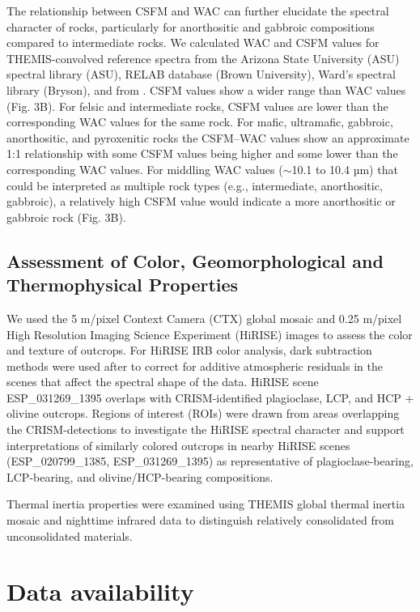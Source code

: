 \documentclass[11pt]{article}
\begin{document}
The relationship between CSFM and WAC can further elucidate the spectral character of rocks, particularly for anorthositic and gabbroic compositions compared to intermediate rocks. We calculated WAC and CSFM values for THEMIS-convolved reference spectra from the Arizona State University (ASU) spectral library (ASU), RELAB database (Brown University), Ward's spectral library (Bryson), and from \citet{Dunn2021}. CSFM values show a wider range than WAC values (Fig. 3B). For felsic and intermediate rocks, CSFM values are lower than the corresponding WAC values for the same rock. For mafic, ultramafic, gabbroic, anorthositic, and pyroxenitic rocks the CSFM--WAC values show an approximate 1:1 relationship with some CSFM values being higher and some lower than the corresponding WAC values. For middling WAC values ($\sim$10.1 to 10.4 µm) that could be interpreted as multiple rock types (e.g., intermediate, anorthositic, gabbroic), a relatively high CSFM value would indicate a more anorthositic or gabbroic rock (Fig. 3B).

\subsection*{Assessment of Color, Geomorphological and Thermophysical Properties}

We used the 5 m/pixel Context Camera (CTX) global mosaic \citep{Malin2007, Dickson2018} and 0.25 m/pixel High Resolution Imaging Science Experiment (HiRISE) images \citep{McEwen2010} to assess the color and texture of outcrops. For HiRISE IRB color analysis, dark subtraction methods were used after \citet{Tornabene2018} to correct for additive atmospheric residuals in the scenes that affect the spectral shape of the data. HiRISE scene ESP\_031269\_1395 overlaps with CRISM-identified plagioclase, LCP, and HCP + olivine outcrops. Regions of interest (ROIs) were drawn from areas overlapping the CRISM-detections to investigate the HiRISE spectral character and support interpretations of similarly colored outcrops in nearby HiRISE scenes (ESP\_020799\_1385, ESP\_031269\_1395) as representative of plagioclase-bearing, LCP-bearing, and olivine/HCP-bearing compositions.

Thermal inertia properties were examined using THEMIS global thermal inertia mosaic \citep{Fergason2006, Edwards2009} and nighttime infrared data \citep{Edwards2011} to distinguish relatively consolidated from unconsolidated materials.

\section*{Data availability}
\end{document}
